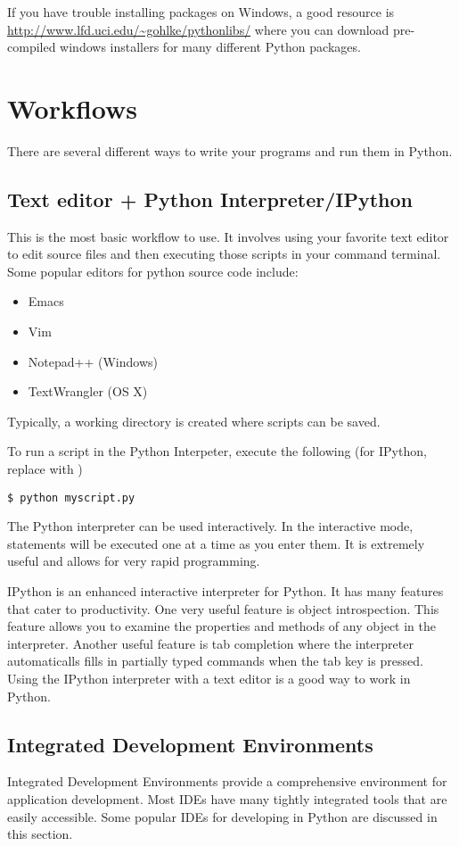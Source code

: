 If you have trouble installing packages on Windows, a good resource is
\url{http://www.lfd.uci.edu/~gohlke/pythonlibs/} where you can download pre-compiled
windows installers for many different Python packages.

\section*{Workflows}
There are several different ways to write your programs and run them in Python.

\subsection*{Text editor + Python Interpreter/IPython}
This is the most basic workflow to use.
It involves using your favorite text editor to edit source files and then executing
those scripts in your command terminal.
Some popular editors for python source code include:
\begin{itemize}
\item Emacs
\item Vim
\item Notepad++ (Windows)
\item TextWrangler (OS X)
\end{itemize}
Typically, a working directory is created where scripts can be saved.

To run a script in the Python Interpeter, execute the following (for IPython, replace
 with )
\begin{verbatim}
$ python myscript.py
\end{verbatim}
The Python interpreter can be used interactively.
In the interactive mode, statements will be executed one at a time as you enter them.
It is extremely useful and allows for very rapid programming.

IPython is an enhanced interactive interpreter for Python.
It has many features that cater to productivity.
One very useful feature is object introspection.
This feature allows you to examine the properties and methods of any object in the
interpreter.
Another useful feature is tab completion where the interpreter automaticalls fills in partially typed commands when the tab key is pressed.
Using the IPython interpreter with a text editor is a good way to work in Python.

\subsection*{Integrated Development Environments}
Integrated Development Environments provide a comprehensive environment for
application development.
Most IDEs have many tightly integrated tools that are easily accessible.
Some popular IDEs for developing in Python are discussed in this section.

